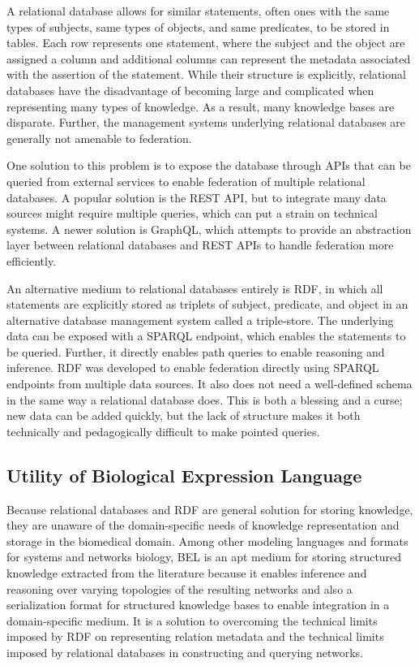 A relational database allows for similar statements, often ones with the same types of subjects, same types of objects, and same predicates, to be stored in tables. Each row represents one statement, where the subject and the object are assigned a column and additional columns can represent the metadata associated with the assertion of the statement. While their structure is explicitly, relational databases have the disadvantage of becoming large and complicated when representing many types of knowledge. As a result, many knowledge bases are disparate. Further, the management systems underlying relational databases are generally not amenable to federation.

One solution to this problem is to expose the database through \ac{API}s that can be queried from external services to enable federation of multiple relational databases. A popular solution is the \ac{REST} \ac{API}, but to integrate many data sources might require multiple queries, which can put a strain on technical systems. A newer solution is \ac{GraphQL}, which attempts to provide an abstraction layer between relational databases and \ac{REST} \ac{API}s to handle federation more efficiently.

An alternative medium to relational databases entirely is \ac{RDF}, in which all statements are explicitly stored as triplets of subject, predicate, and object in an alternative database management system called a triple-store. The underlying data can be exposed with a \ac{SPARQL} endpoint, which enables the statements to be queried. Further, it directly enables path queries to enable reasoning and inference. \ac{RDF} was developed to enable federation directly using \ac{SPARQL} endpoints from multiple data sources. It also does not need a well-defined schema in the same way a relational database does. This is both a blessing and a curse; new data can be added quickly, but the lack of structure makes it both technically and pedagogically difficult to make pointed queries.

\subsection{Utility of Biological Expression Language}
Because relational databases and \ac{RDF} are general solution for storing knowledge, they are unaware of the domain-specific needs of knowledge representation and storage in the biomedical domain. Among other modeling languages and formats for systems and networks biology, \ac{BEL} is an apt medium for storing structured knowledge extracted from the literature because it enables inference and reasoning over varying topologies of the resulting networks and also a serialization format for structured knowledge bases to enable integration in a domain-specific medium. It is a solution to overcoming the technical limits imposed by RDF on representing relation metadata and the technical limits imposed by relational databases in constructing and querying networks.

